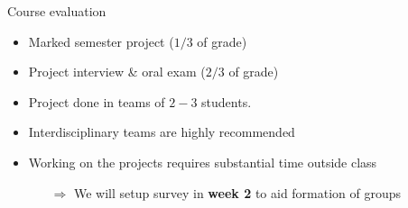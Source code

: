 \begin{frame}{Course evaluation}
    \setlength{\leftmargini}{0ex}
    \setlength{\leftmarginii}{4ex}
    \begin{itemize}
        \item Marked semester project \textcolor{grey5}{($1/3$ of grade)}
        \item Project interview \& oral exam \textcolor{grey5}{($2/3$ of grade)}
        \item Project done in \alert{teams of $2-3$ students}.
        \item Interdisciplinary teams are highly recommended
        \vspace{1.5em}
        \item Working on the projects
            \alert{requires substantial time outside class}
            \begin{itemize}
            \vspace{-0.3em}
            \item[$\Rightarrow$] We will setup \alert{survey} in \textbf{week 2} to \alert{aid formation of groups}
            \end{itemize}
    \end{itemize}
\end{frame}


